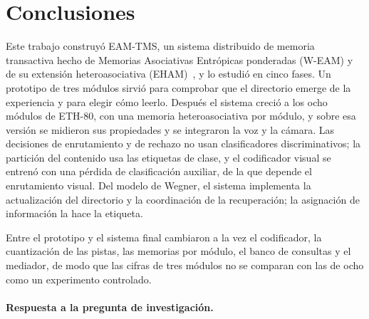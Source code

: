 \section{Conclusiones}
\label{sec:conclusiones}

Este trabajo construyó EAM-TMS, un sistema distribuido de memoria transactiva hecho de
Memorias Asociativas Entrópicas ponderadas (W-EAM) y de su extensión heteroasociativa
(EHAM)~\cite{pineda2021entropic,pineda2022weighted,morales2025missing}, y lo estudió en
cinco fases.
Un prototipo de tres módulos sirvió para comprobar que el directorio emerge de la experiencia y
para elegir cómo leerlo.
Después el sistema creció a los ocho módulos de ETH-80, con una memoria heteroasociativa
por módulo, y sobre esa versión se midieron sus propiedades y se integraron la voz y la
cámara.
Las decisiones de enrutamiento y de rechazo no usan clasificadores discriminativos; la
partición del contenido usa las etiquetas de clase, y el codificador visual se entrenó
con una pérdida de clasificación auxiliar, de la que depende el enrutamiento visual.
Del modelo de Wegner, el sistema implementa la actualización del directorio y la
coordinación de la recuperación; la asignación de información la hace la etiqueta.

Entre el prototipo y el sistema final cambiaron a la vez el codificador, la cuantización
de las pistas, las memorias por módulo, el banco de consultas y el mediador, de modo que
las cifras de tres módulos no se comparan con las de ocho como un experimento controlado.

\paragraph{Respuesta a la pregunta de investigación.}
